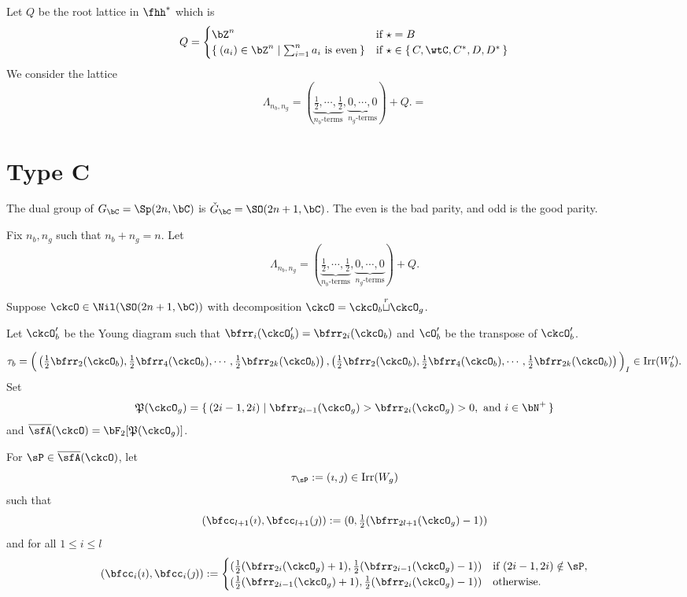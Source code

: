 \documentclass[12pt,a4paper]{amsart}
\newcommand{\CQ}{{\mathcal {Q}}}
\numberwithin{equation}{section}
\theoremstyle{remark}
\def\half{{\tfrac{1}{2}}}
\def\Irr{\mathrm{Irr}}
\def\ckGc{\check{G}_{\bC}}
\def\Gc{G_\bC}
\def\cuprow{{\stackrel{r}{\sqcup}}}
\def\CQ{\overline{\sfA}}%
\def\CPP{\mathfrak{P}}
\begin{document}
Let $Q$ be the root lattice in $\fhh^{*}$
which is
\[
Q = \begin{cases}
  \bZ^{n} & \text{if  $\star = B$}\\
  \Set{(a_{i})\in \bZ^{n}|\sum_{i=1}^{n}a_{i} \text{ is even}}
    & \text{if  $\star \in \set{C,\wtC,C^{*},D,D^{*}}$}\\
\end{cases}
\]
We consider the lattice
\[
  \Lambda_{n_{b},n_{g}} =
  (\underbrace{\half, \cdots, \half}_{n_{b}\text{-terms}}, \underbrace{0, \cdots, 0}_{n_{g}\text{-terms}}) + Q.
  =
\]

\section{Type C}

  The dual group of $\Gc = \Sp(2n,\bC)$ is $\ckGc = \SO(2n+1,\bC)$. The even is
  the bad parity, and odd is the good parity.


  Fix $n_{b},n_{g}$ such that $n_{b}+ n_{g} = n$. Let
  \begin{equation} \label{eq:Lam.C}
    \Lambda_{n_{b},n_{g}} = (\underbrace{\half, \cdots, \half}_{n_{b}\text{-terms}}, \underbrace{0, \cdots, 0}_{n_{g}\text{-terms}}) + Q.
  \end{equation}

  Suppose $\ckcO\in \Nil(\SO(2n+1,\bC))$ with decomposition
  $\ckcO = \ckcO_{b}\cuprow \ckcO_{g}$.

  Let $\ckcO'_b$ be the Young diagram such that
  $\bfrr_i(\ckcO'_b) = \bfrr_{2i}(\ckcO_b)$ and $\cO'_{b}$ be the transpose of
  $\ckcO'_{b}$.


  \[
    \tau_{b} = \Big( \left(\half\bfrr_{2}(\ckcO_{b}), \half\bfrr_{4}(\ckcO_{b}),\cdots, \half\bfrr_{2k}(\ckcO_{b})\right), \left(\half\bfrr_{2}(\ckcO_{b}), \half\bfrr_{4}(\ckcO_{b}),\cdots, \half\bfrr_{2k}(\ckcO_{b}) \right)\Big)_{I} \in \Irr(W'_{b}).
  \]
  Set
  \[
    \CPP(\ckcO_{g}) = \set{(2i-1,2i)| \bfrr_{2i-1}(\ckcO_{g})> \bfrr_{2i}(\ckcO_{g})>0, \text{
        and } i\in \bN^{+}}
  \]
  and $\CQ(\ckcO)= \bF_{2}[\CPP(\ckcO_{g})]$.

  For $\sP \in \CQ(\ckcO)$, let
  \[
    \tau_{\sP} := (\imath,\jmath) \in \Irr(W_{g})
  \]
  such that
  \[
    (\bfcc_{l+1}(\imath), \bfcc_{l+1}(\jmath)) := (0,\half(\bfrr_{2l+1}(\ckcO_{g})-1))
  \]
  and for all $1\leq i\leq l$
  \[
    (\bfcc_{i}(\imath), \bfcc_{i}(\jmath)):=
    \begin{cases}
      (\half (\bfrr_{2i}(\ckcO_{g})+1), \half (\bfrr_{2i-1}(\ckcO_{g})-1))
      & \text{if } (2i-1,2i)\notin \sP,\\
      (\half (\bfrr_{2i-1}(\ckcO_{g})+1),\half (\bfrr_{2i}(\ckcO_{g})-1)) & \text{otherwise.}
    \end{cases}
  \]
\end{document}
